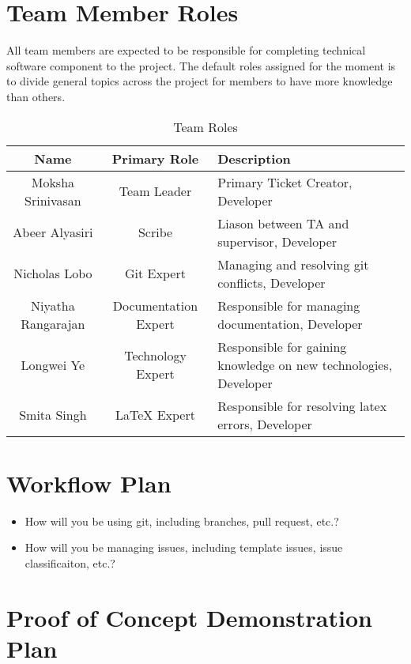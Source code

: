 \documentclass{article}
\begin{document}
\section{Team Member Roles} 
All team members are expected to be responsible for completing technical software component to the project. The default roles assigned for the moment is to divide general topics across the project for members to have more knowledge than others. 
\begin{table}[H]
    \centering
    \begin{tabular}{|c|c|p{60mm}|}
         \hline
         Name & Primary Role & Description\\
         \hline
         Moksha Srinivasan & Team Leader & Primary Ticket Creator, Developer\\
         \hline
         Abeer Alyasiri & Scribe & Liason between TA and supervisor, Developer\\
         \hline
         Nicholas Lobo & Git Expert & Managing and resolving git conflicts, Developer \\
         \hline
         Niyatha Rangarajan & Documentation Expert & Responsible for managing documentation, Developer \\
         \hline
         Longwei Ye & Technology Expert & Responsible for gaining knowledge on new technologies, Developer  \\
         \hline
         Smita Singh & LaTeX Expert & Responsible for resolving latex errors, Developer \\
         \hline
    \end{tabular}
    \caption{Team Roles}
    \label{tab:team_roles}
\end{table}

\section{Workflow Plan}

\begin{itemize}
	\item How will you be using git, including branches, pull request, etc.?
	\item How will you be managing issues, including template issues, issue
	classificaiton, etc.?
\end{itemize}

\section{Proof of Concept Demonstration Plan}
\end{document}

